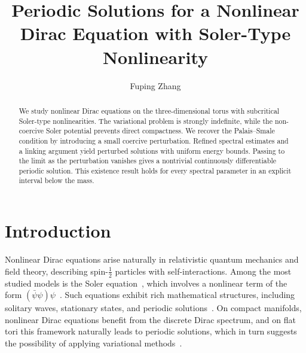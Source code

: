 \documentclass[11pt,final]{amsart}
\title[Periodic Solutions]{Periodic Solutions for a Nonlinear Dirac Equation with Soler-Type Nonlinearity}
\author[F. Zhang]{Fuping Zhang}
\begin{document}
\begin{abstract}
We study nonlinear Dirac equations on the three-dimensional torus with subcritical Soler-type nonlinearities. The variational problem is strongly indefinite, while the non-coercive Soler potential prevents direct compactness. We recover the Palais--Smale condition by introducing a small coercive perturbation. Refined spectral estimates and a linking argument yield perturbed solutions with uniform energy bounds. Passing to the limit as the perturbation vanishes gives a nontrivial continuously differentiable periodic solution. This existence result holds for every spectral parameter in an explicit interval below the mass.



\end{abstract}



\maketitle



\section{Introduction}


Nonlinear Dirac equations arise naturally in relativistic quantum mechanics and field theory, describing spin-$\frac{1}{2}$ particles with self-interactions. Among the most studied models is the Soler equation~\cite{BoussaidComech2019Nonlinear,Soler1970Classical}, which involves a nonlinear term of the form $(\bar{\psi}\psi)\psi$~\cite{BalabaneCazenave1988Existence,Balabane1988Existence,Balabane1990Existence, Merle1988Existence}. Such equations exhibit rich mathematical structures, including solitary waves, stationary states, and periodic solutions~\cite{DingLiu2014periodic,EstebanSere1995stationary,Esteban2002overview}. On compact manifolds, nonlinear Dirac equations benefit from the discrete Dirac spectrum, and on flat tori this framework naturally leads to periodic solutions, which in turn suggests the possibility of applying variational methods~\cite{BartschDing2006Solutions,Ding2007variational,DingLiXu2016bifurcation,DingRuf2008Solutions}.
\end{document}

